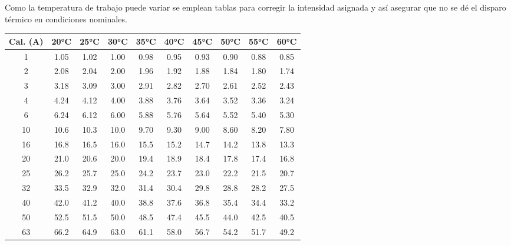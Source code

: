 Como la temperatura de trabajo puede variar se emplean tablas para corregir la intensidad asignada y así asegurar que no se dé el disparo térmico en condiciones nominales.
\begin{table}[H]
	\centering
	\begin{tabular}{|c|c|c|c|c|c|c|c|c|c|}
		\hline
		\textbf{Cal. (A)} & \textbf{20°C} & \textbf{25°C} & \textbf{30°C} & \textbf{35°C} & \textbf{40°C} & \textbf{45°C} & \textbf{50°C} & \textbf{55°C} & \textbf{60°C} \\ \hline
		1  & 1.05 & 1.02 & 1.00 & 0.98 & 0.95 & 0.93 & 0.90 & 0.88 & 0.85 \\ \hline
		2  & 2.08 & 2.04 & 2.00 & 1.96 & 1.92 & 1.88 & 1.84 & 1.80 & 1.74 \\ \hline
		3  & 3.18 & 3.09 & 3.00 & 2.91 & 2.82 & 2.70 & 2.61 & 2.52 & 2.43 \\ \hline
		4  & 4.24 & 4.12 & 4.00 & 3.88 & 3.76 & 3.64 & 3.52 & 3.36 & 3.24 \\ \hline
		6  & 6.24 & 6.12 & 6.00 & 5.88 & 5.76 & 5.64 & 5.52 & 5.40 & 5.30 \\ \hline
		10 & 10.6 & 10.3 & 10.0 & 9.70 & 9.30 & 9.00 & 8.60 & 8.20 & 7.80 \\ \hline
		16 & 16.8 & 16.5 & 16.0 & 15.5 & 15.2 & 14.7 & 14.2 & 13.8 & 13.3 \\ \hline
		20 & 21.0 & 20.6 & 20.0 & 19.4 & 18.9 & 18.4 & 17.8 & 17.4 & 16.8 \\ \hline
		25 & 26.2 & 25.7 & 25.0 & 24.2 & 23.7 & 23.0 & 22.2 & 21.5 & 20.7 \\ \hline
		32 & 33.5 & 32.9 & 32.0 & 31.4 & 30.4 & 29.8 & 28.8 & 28.2 & 27.5 \\ \hline
		40 & 42.0 & 41.2 & 40.0 & 38.8 & 37.6 & 36.8 & 35.4 & 34.4 & 33.2 \\ \hline
		50 & 52.5 & 51.5 & 50.0 & 48.5 & 47.4 & 45.5 & 44.0 & 42.5 & 40.5 \\ \hline
		63 & 66.2 & 64.9 & 63.0 & 61.1 & 58.0 & 56.7 & 54.2 & 51.7 & 49.2 \\ \hline
	\end{tabular}
\end{table}

